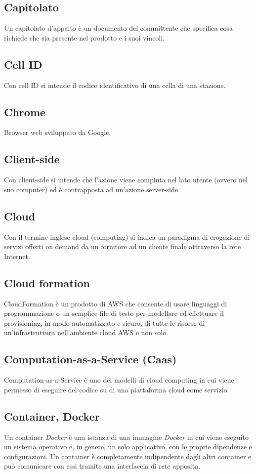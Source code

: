 \subsection{Capitolato}  Un capitolato d'appalto è un documento del committente che specifica cosa richiede che sia presente nel prodotto e i suoi vincoli.
\subsection{Cell ID}  Con cell ID si intende il codice identificativo di una cella di una stazione.
\subsection{Chrome}  Browser web sviluppato da Google.
\subsection{Client-side}  Con client-side si intende che l'azione viene compiuta nel lato utente (ovvero nel suo computer) ed è contrapposta ad un'azione server-side.
\subsection{Cloud}  Con il termine inglese cloud (computing) si indica un paradigma di erogazione di servizi offerti on demand da un fornitore ad un cliente finale attraverso la rete Internet. 
\subsection{Cloud formation}  CloudFormation è un prodotto di AWS che consente di usare linguaggi di programmazione o un semplice file di testo per modellare ed effettuare il provisioning, in modo automatizzato e sicuro, di tutte le risorse di un'infrastruttura nell'ambiente cloud AWS e non solo.
\subsection{Computation-as-a-Service (Caas)}  Computation-as-a-Service è uno dei modelli di cloud computing in cui viene permesso di eseguire del codice su di una piattaforma cloud come servizio.
\subsection{Container, Docker}  Un container \textit{Docker} è una istanza di una immagine \textit{Docker} in cui viene eseguito un sistema operativo e, in genere, un solo applicativo, con le proprie dipendenze e configurazioni. Un container è completamente indipendente dagli altri container e può comunicare con essi tramite una interfaccia di rete apposita.
